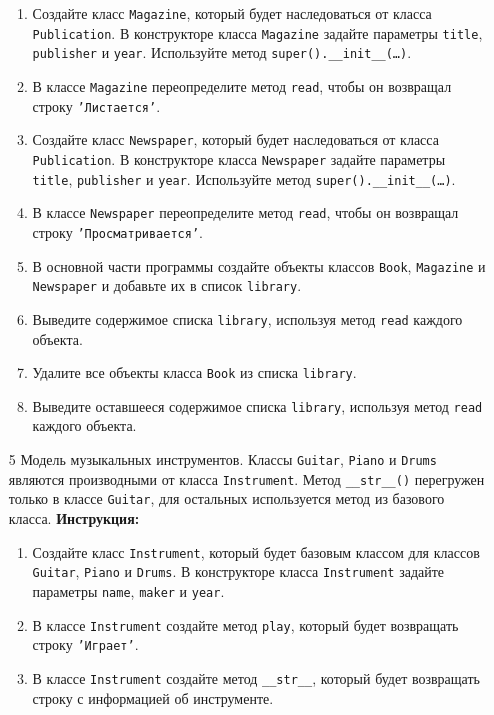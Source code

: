 \begin{enumerate}
\begin{enumerate}
    \item Создайте класс \texttt{Magazine}, который будет наследоваться от класса \texttt{Publication}. В конструкторе класса \texttt{Magazine} задайте параметры \texttt{title}, \texttt{publisher} и \texttt{year}. Используйте метод \texttt{super().\_\_init\_\_(\ldots)}.
    \item В классе \texttt{Magazine} переопределите метод \texttt{read}, чтобы он возвращал строку \texttt{'Листается'}.
    \item Создайте класс \texttt{Newspaper}, который будет наследоваться от класса \texttt{Publication}. В конструкторе класса \texttt{Newspaper} задайте параметры \texttt{title}, \texttt{publisher} и \texttt{year}. Используйте метод \texttt{super().\_\_init\_\_(\ldots)}.
    \item В классе \texttt{Newspaper} переопределите метод \texttt{read}, чтобы он возвращал строку \texttt{'Просматривается'}.
    \item В основной части программы создайте объекты классов \texttt{Book}, \texttt{Magazine} и \texttt{Newspaper} и добавьте их в список \texttt{library}.
    \item Выведите содержимое списка \texttt{library}, используя метод \texttt{read} каждого объекта.
    \item Удалите все объекты класса \texttt{Book} из списка \texttt{library}.
    \item Выведите оставшееся содержимое списка \texttt{library}, используя метод \texttt{read} каждого объекта.
\end{enumerate}
\item[5]
Модель музыкальных инструментов. Классы \texttt{Guitar}, \texttt{Piano} и \texttt{Drums} являются производными от класса \texttt{Instrument}. Метод \texttt{\_\_str\_\_()} перегружен только в классе \texttt{Guitar}, для остальных используется метод из базового класса.
\textbf{Инструкция:}
\begin{enumerate}
    \item Создайте класс \texttt{Instrument}, который будет базовым классом для классов \texttt{Guitar}, \texttt{Piano} и \texttt{Drums}. В конструкторе класса \texttt{Instrument} задайте параметры \texttt{name}, \texttt{maker} и \texttt{year}.
    \item В классе \texttt{Instrument} создайте метод \texttt{play}, который будет возвращать строку \texttt{'Играет'}.
    \item В классе \texttt{Instrument} создайте метод \texttt{\_\_str\_\_}, который будет возвращать строку с информацией об инструменте.

\end{enumerate}
\end{enumerate}
